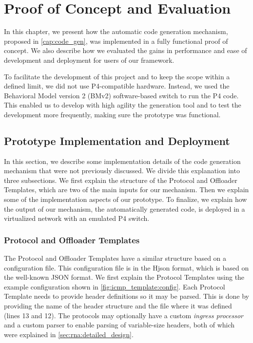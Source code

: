 \chapter{Proof of Concept and Evaluation}
\label{cap:evaluation}

In this chapter, we present how the automatic code generation mechanism, proposed in \autoref{cap:code_gen}, was implemented in a fully functional proof of concept. We also describe how we evaluated the gains in performance and ease of development and deployment for users of our framework.

To facilitate the development of this project and to keep the scope within a defined limit, we did not use P4-compatible hardware. Instead, we used the Behavioral Model version 2 (BMv2) software-based switch \cite{BMv2} to run the P4 code. This enabled us to develop with high agility the generation tool and to test the development more frequently, making sure the prototype was functional.


\section{Prototype Implementation and Deployment}
\label{sec:evaluation:implementation}

In this section, we describe some implementation details of the code generation mechanism that were not previously discussed. We divide this explanation into three subsections. We first explain the structure of the Protocol and Offloader Templates, which are two of the main inputs for our mechanism. Then we explain some of the implementation aspects of our prototype. To finalize, we explain how the output of our mechanism, the automatically generated code, is deployed in a virtualized network with an emulated P4 switch.


\subsection{Protocol and Offloader Templates}

The Protocol and Offloader Templates have a similar structure based on a configuration file. This configuration file is in the Hjson \cite{Hjson} format, which is based on the well-known JSON format. We first explain the Protocol Templates using the example configuration shown in \autoref{fig:icmp_template:config}. Each Protocol Template needs to provide header definitions so it may be parsed. This is done by providing the name of the header structure and the file where it was defined (lines 13 and 12). The protocols may optionally have a custom \textit{ingress processor} and a custom parser to enable parsing of variable-size headers, both of which were explained in \autoref{sec:rna:detailed_design}.

